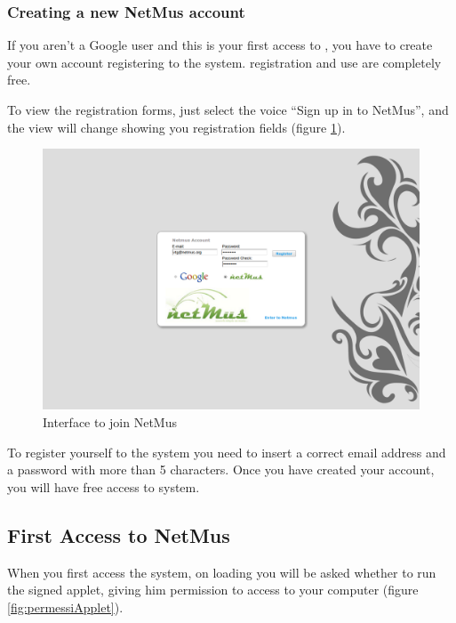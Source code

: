 \subsubsection*{Creating a new NetMus account}
If you aren't a Google user and this is your first access to , you
have to create your own account registering to the system.
 registration and use are completely free.

To view the registration forms, just select the voice ``Sign up in to NetMus'',
and the view will change showing you registration fields (figure
\ref{fig:registrazione}).

\begin{figure}[!htbp]
  \centering
  \includegraphics[width=14cm]{img/MU/registration.png}
\caption{Interface to join NetMus}
\label{fig:registrazione}
\end{figure}

To register yourself to the system you need to insert a correct email address
and a password with more than 5 characters. Once you have created your account,
you will have free access to  system.

\newpage
\subsection{First Access to NetMus}

When you first access the system, on loading you
will be asked whether to run the signed applet, giving him permission to access
to your computer (figure \ref{fig:permessiApplet}).

